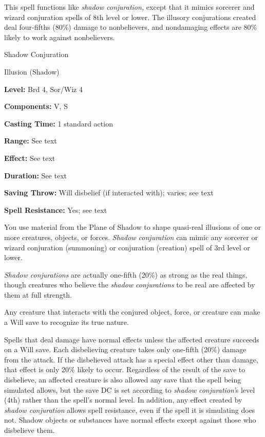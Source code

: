 \documentclass{article}
\begin{document}
This spell functions like \textit{shadow conjuration, }except that it mimics sorcerer 
and wizard conjuration spells of 8th level or lower. The illusory conjurations 
created deal four-fifths (80\%) damage to nonbelievers, and nondamaging effects 
are 80\% likely to work against nonbelievers.

\vspace{12pt}
Shadow Conjuration

Illusion (Shadow)

\textbf{Level:} Brd 4, Sor/Wiz 4

\textbf{Components:} V, S

\textbf{Casting Time:} 1 standard action

\textbf{Range:} See text

\textbf{Effect:} See text

\textbf{Duration:} See text

\textbf{Saving Throw: }Will disbelief (if interacted with); varies; see text

\textbf{Spell Resistance:} Yes; see text

You use material from the Plane of Shadow to shape quasi-real illusions of one 
or more creatures, objects, or forces. \textit{Shadow conjuration }can mimic any 
sorcerer or wizard conjuration (summoning) or conjuration (creation) spell of 3rd 
level or lower.

\textit{Shadow conjurations }are actually one-fifth (20\%) as strong as the real 
things, though creatures who believe the \textit{shadow conjurations }to be real 
are affected by them at full strength.

Any creature that interacts with the conjured object, force, or creature can make 
a Will save to recognize its true nature.

Spells that deal damage have normal effects unless the affected creature succeeds 
on a Will save. Each disbelieving creature takes only one-fifth (20\%) damage from 
the attack. If the disbelieved attack has a special effect other than damage, that 
effect is only 20\% likely to occur. Regardless of the result of the save to disbelieve, 
an affected creature is also allowed any save that the spell being simulated allows, 
but the save DC is set according to \textit{shadow conjuration'}s level (4th) rather 
than the spell's normal level. In addition, any effect created by \textit{shadow 
conjuration }allows spell resistance, even if the spell it is simulating does not. 
Shadow objects or substances have normal effects except against those who disbelieve 
them.
\end{document}
